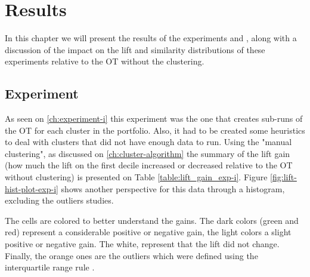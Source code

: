 \chapter{Results}

In this chapter we will present the results of the experiments \nameExperimentI{} and \nameExperimentII{}, along with a discussion of the impact on the lift and similarity distributions of these experiments relative to the OT without the clustering.

\section{Experiment \fullNameExperimentI{}}

As seen on \ref{ch:experiment-i} this experiment was the one that creates sub-runs of the OT for each cluster in the portfolio. Also, it had to be created some heuristics to deal with clusters that did not have enough data to run. Using the "manual clustering", as discussed on \ref{ch:cluster-algorithm} the summary of the lift gain (how much the lift on the first decile increased or decreased relative to the OT without clustering) is presented on Table \ref{table:lift_gain_exp-i}. Figure \ref{fig:lift-hist-plot-exp-i} shows another perspective for this data through a histogram, excluding the outliers studies.

The cells are colored to better understand the gains. The dark colors (green and red) represent a considerable positive or negative gain, the light colors a slight positive or negative gain. The white, represent that the lift did not change. Finally, the orange ones are the outliers which were defined using the interquartile range rule \cite{upton1996understanding}. 

